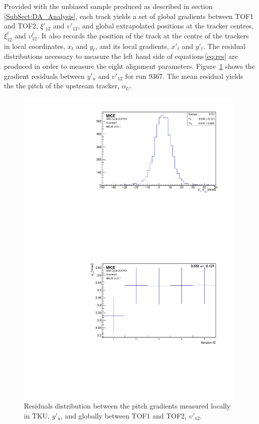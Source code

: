 Provided with the unbiased sample produced as described in section\,\ref{SubSect:DA_Analysis}, each track yields a set of global gradients between TOF1 and TOF2, $\xi'_{12}$ and $\upsilon'_{12}$, and global extrapolated positions at the tracker centres, $\xi_{12}^t$ and $\upsilon_{12}^t$. It also records the position of the track at the centre of the trackers in local coordinates, $x_t$ and $y_t$, and its local gradients, $x'_t$ and $y'_t$. The residual distributions necessary to measure the left hand side of equations\,\ref{eq:res} are produced in order to measure the eight alignment parameters. Figure~\ref{fig:resyp} shows the gradient residuals between $y'_u$ and $\upsilon'_{12}$ for run 9367. The mean residual yields the the pitch of the upstream tracker, $\alpha_U$.

\begin{figure} [!htb]
	\begin{minipage}[b]{.48\textwidth}
		\centering
		\includegraphics[width=\textwidth]{tku_resyp.pdf}
		\caption{Residuals distribution between the pitch gradients measured locally in TKU, $y'_u$, and globally between TOF1 and TOF2, $\upsilon'_{12}$.}
		\label{fig:resyp}
	\end{minipage}
	\hfill
	\begin{minipage}[b]{.48\textwidth}
		\centering
		\includegraphics[width=\textwidth]{tku_optalpha.pdf}

\end{minipage}
\end{figure}
